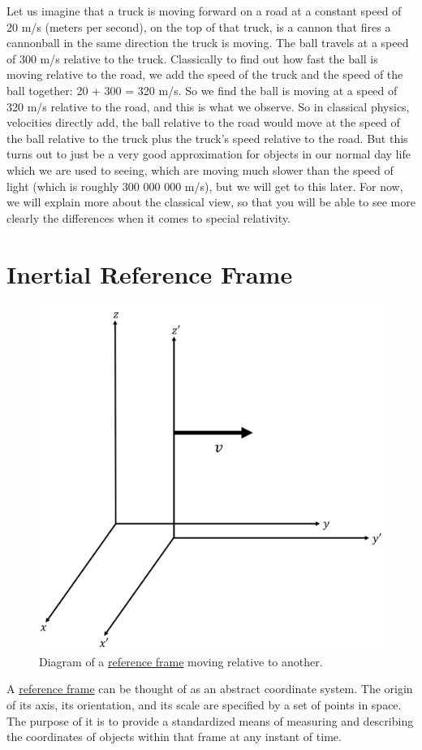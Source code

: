 Let us imagine that a truck is moving forward on a road at a constant speed of 20 m/s (meters per second), on the top of that truck, is a cannon that fires a cannonball in the same direction the truck is moving. The ball travels at a speed of 300 m/s relative to the truck. Classically to find out how fast the ball is moving relative to the road, we add the speed of the truck and the speed of the ball together: 20 + 300 = 320 m/s. So we find the ball is moving at a speed of 320 m/s relative to the road, and this is what we observe. So in classical physics, velocities directly add, the ball relative to the road would move at the speed of the ball relative to the truck plus the truck's speed relative to the road.
But this turns out to just be a very good approximation for objects in our normal day life which we are used to seeing, which are moving much slower than the speed of light (which is roughly 300 000 000 m/s), but we will get to this later. For now, we will explain more about the classical view, so that you will be able to see more clearly the differences when it comes to special relativity.

\section{Inertial Reference Frame}



\begin{figure}[H]
	\centering
	\includegraphics[width=0.35 \textwidth]{images/pdf/Reference Frames.pdf}
	\caption{Diagram of a \protect\hyperlink{def-Reference-frame}{reference frame} moving relative to another.}
	\label{fig: Reference Frames}
\end{figure}


A \hyperlink{def-Reference-frame}{reference frame} can be thought of as an abstract coordinate system. The origin of its axis, its orientation, and its scale are specified by a set of points in space. The purpose of it is to provide a standardized means of measuring and describing the coordinates of objects within that frame at any instant of time.

